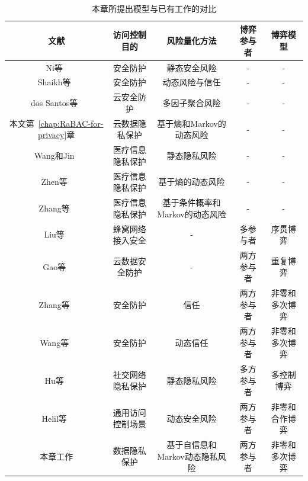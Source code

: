 \begin{table}[htb]
	
	\caption{本章所提出模型与已有工作的对比}\label{tab:comparison}
	\small
	\centering 
	\begin{tabular}{ccccc}
		\toprule
		文献 & 访问控制目的 & 风险量化方法 & 博弈参与者 & 博弈模型 \\
		\hline
		Ni等~\cite{ni2010risk} & 安全防护 &静态安全风险&-&-\\ 
		Shaikh等~\cite{shaikh2012dynamic} & 安全防护 & 动态风险与信任&-&-\\
		dos Santos等~\cite{santos2016framework} &云安全防护 & 多因子聚合风险 &-&-\\
		本文第~\ref{chap:RaBAC-for-privacy}章& 云数据隐私保护& 基于熵和Markov的动态风险 & - & -\\
		Wang和Jin~\cite{wang2011quantified} & 医疗信息隐私保护 & 静态隐私风险 &-&-\\
		Zhen等~\cite{zhen2015risk} & 医疗信息隐私保护& 基于熵的动态风险 & - & -\\
		Zhang等~\cite{zhang2018privacy} & 医疗信息隐私保护& 基于条件概率和Markov的动态风险 &-&-\\
		Liu等~\cite{liu2016dynamic} & 蜂窝网络接入安全&-&	多参与者&	序贯博弈\\
		Gao等~\cite{gao2018game} & 云数据安全防护& -&两方参与者&重复博弈\\
		Zhang等~\cite{zhang2015towards} & 安全防护& 信任 & 两方参与者& 非零和多次博弈\\
		Wang等~\cite{wang2019game} & 安全防护& 动态信任 & 两方参与者 & 非零和多次博弈\\
		Hu等~\cite{hu2014game} & 社交网络隐私保护&静态隐私风险&多方参与者&	多控制博弈\\
		Helil等~\cite{helil2017non} & 通用访问控制场景&动态安全风险&两方参与者&非零和合作博弈\\
		本章工作 & 数据隐私保护& 基于自信息和Markov动态隐私风险 & 两方参与者& 非零和多次博弈\\
		\bottomrule 
	\end{tabular}
\end{table}


